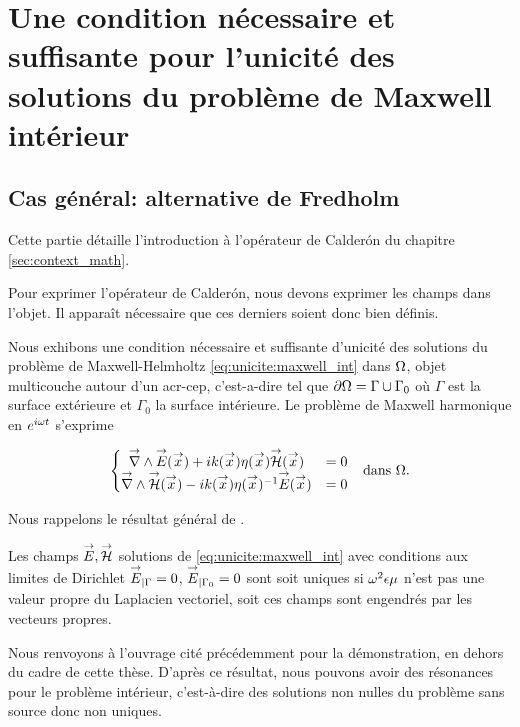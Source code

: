 \section[Une CNS pour l'unicité des solutions du problème de Maxwell intérieur]{Une condition nécessaire et suffisante pour l'unicité des solutions du problème de Maxwell intérieur}
  \subsection{Cas général: alternative de Fredholm}

    Cette partie détaille l'introduction à l'opérateur de Calderón du chapitre \ref{sec:context_math}.

    Pour exprimer l'opérateur de Calderón,
    nous devons exprimer les champs dans l'objet. Il apparaît nécessaire que ces derniers soient donc bien définis.

    Nous exhibons une condition nécessaire et suffisante d'unicité des solutions du problème de Maxwell-Helmholtz  \eqref{eq:unicite:maxwell_int} dans \(\Omega\), objet multicouche autour d'un \gls{acr-cep}, c'est-a-dire tel que \(\partial \Omega = \Gamma \cup \Gamma_0\) où \(\Gamma\) est la surface extérieure et \(\Gamma_0\) la surface intérieure. Le problème de Maxwell harmonique en \(e^{i\omega t}\) s'exprime

    \begin{align}
    \left\lbrace
      \begin{matrix}
        {\overset{\rightarrow}{\nabla}}\wedge {\overset{\rightarrow}{E}}({\overset{\rightarrow}{x}}) + i k({\overset{\rightarrow}{x}})\eta({\overset{\rightarrow}{x}}) {\overset{\rightarrow}{\mathcal{H}}}({\overset{\rightarrow}{x}}) &= 0
        \\
        {\overset{\rightarrow}{\nabla}}\wedge {\overset{\rightarrow}{\mathcal{H}}}({\overset{\rightarrow}{x}}) - i k({\overset{\rightarrow}{x}})\eta({\overset{\rightarrow}{x}})^{-1} {\overset{\rightarrow}{E}}({\overset{\rightarrow}{x}}) &= 0
      \end{matrix}
      \right. && \text{dans \(\Omega\).}
      \label{eq:unicite:maxwell_int}
    \end{align}

    Nous rappelons le résultat général de \cite[Théorème~8, p.~111]{cessenat_mathematical_1996}.
    \begin{thm}
      Les champs \({\overset{\rightarrow}{E}},{\overset{\rightarrow}{\mathcal{H}}}\) solutions de \eqref{eq:unicite:maxwell_int} avec conditions aux limites de Dirichlet \({\overset{\rightarrow}{E}}_{|\Gamma} = 0\), \({\overset{\rightarrow}{E}}_{|\Gamma_0} = 0\) sont soit uniques si \(\omega^2\epsilon\mu\) n'est pas une valeur propre du Laplacien vectoriel, soit ces champs sont engendrés par les vecteurs propres.
    \end{thm}
    Nous renvoyons à l'ouvrage cité précédemment pour la démonstration, en dehors du cadre de cette thèse.
    D'après ce résultat, nous pouvons avoir des résonances pour le problème intérieur, c'est-à-dire des solutions non nulles du problème sans source donc non uniques.

